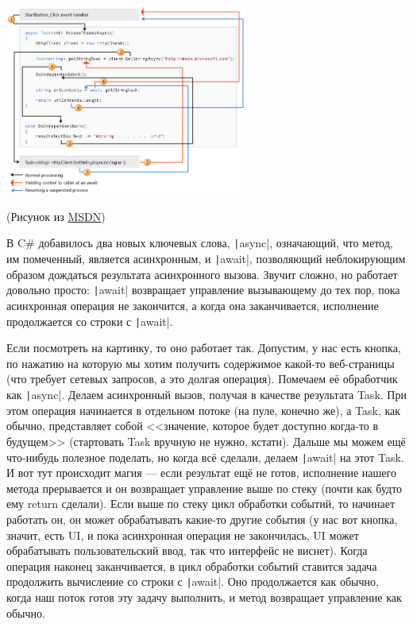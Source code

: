 \documentclass[a5paper]{article}
\begin{document}
\begin{center}
    \includegraphics[width=0.6\textwidth]{asyncAwait.png}

    \begin{footnotesize}(Рисунок из \href{https://msdn.microsoft.com/library/hh191443(vs.110).aspx}{MSDN})\end{footnotesize}
\end{center}

В C\# добавилось два новых ключевых слова, \texttt|async|, означающий, что метод, им помеченный, является асинхронным, и \texttt|await|, позволяющий неблокирующим образом дождаться результата асинхронного вызова. Звучит сложно, но работает довольно просто: \texttt|await| возвращает управление вызывающему до тех пор, пока асинхронная операция не закончится, а когда она заканчивается, исполнение продолжается со строки с \texttt|await|. 

Если посмотреть на картинку, то оно работает так. Допустим, у нас есть кнопка, по нажатию на которую мы хотим получить содержимое какой-то веб-страницы (что требует сетевых запросов, а это долгая операция). Помечаем её обработчик как \texttt|async|. Делаем асинхронный вызов, получая в качестве результата Task. При этом операция начинается в отдельном потоке (на пуле, конечно же), а Task, как обычно, представляет собой <<значение, которое будет доступно когда-то в будущем>> (стартовать Task вручную не нужно, кстати). Дальше мы можем ещё что-нибудь полезное поделать, но когда всё сделали, делаем \texttt|await| на этот Task. И вот тут происходит магия --- если результат ещё не готов, исполнение нашего метода прерывается и он возвращает управление выше по стеку (почти как будто ему return сделали). Если выше по стеку цикл обработки событий, то начинает работать он, он может обрабатывать какие-то другие события (у нас вот кнопка, значит, есть UI, и пока асинхронная операция не закончилась, UI может обрабатывать пользовательский ввод, так что интерфейс не виснет). Когда операция наконец заканчивается, в цикл обработки событий ставится задача продолжить вычисление со строки с \texttt|await|. Оно продолжается как обычно, когда наш поток готов эту задачу выполнить, и метод возвращает управление как обычно.
\end{document}
